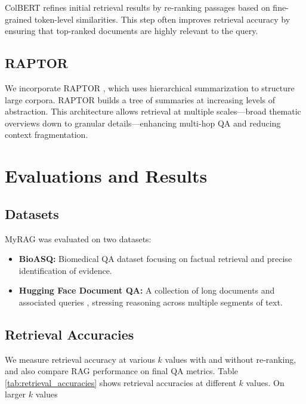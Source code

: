\documentclass{scrartcl}
\begin{document}
ColBERT \cite{khattab2020colbert} refines initial retrieval results by re-ranking passages based on fine-grained token-level similarities. This step often improves retrieval accuracy by ensuring that top-ranked documents are highly relevant to the query.

\subsection{RAPTOR}

We incorporate RAPTOR \cite{wu2021recursively, raptor2024}, which uses hierarchical summarization to structure large corpora. RAPTOR builds a tree of summaries at increasing levels of abstraction. This architecture allows retrieval at multiple scales—broad thematic overviews down to granular details—enhancing multi-hop QA and reducing context fragmentation.

\section{Evaluations and Results}

\subsection{Datasets}

MyRAG was evaluated on two datasets:
\begin{itemize}
    \item \textbf{BioASQ:} Biomedical QA dataset \cite{bioasq2023} focusing on factual retrieval and precise identification of evidence.
    \item \textbf{Hugging Face Document QA:} A collection of long documents and associated queries \cite{huggingface2024docqa}, stressing reasoning across multiple segments of text.
\end{itemize}

\subsection{Retrieval Accuracies}

We measure retrieval accuracy at various $k$ values with and without re-ranking, and also compare RAG performance on final QA metrics. Table \ref{tab:retrieval_accuracies} shows retrieval accuracies at different $k$ values. On larger $k$ values
\end{document}
